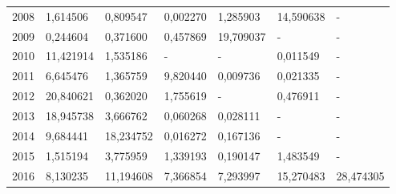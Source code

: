 \begin{table}
\begin{tabular}{p{1cm}p{2cm}p{2cm}p{2cm}p{2cm}p{2cm}p{2cm}}
 2008 &                               1,614506 &                                   0,809547 &               0,002270 &                                     1,285903 &                      14,590638 &                       - \\
 2009 &                               0,244604 &                                   0,371600 &               0,457869 &                                    19,709037 &                              - &                       - \\
 2010 &                              11,421914 &                                   1,535186 &                      - &                                            - &                       0,011549 &                       - \\
 2011 &                               6,645476 &                                   1,365759 &               9,820440 &                                     0,009736 &                       0,021335 &                       - \\
 2012 &                              20,840621 &                                   0,362020 &               1,755619 &                                            - &                       0,476911 &                       - \\
 2013 &                              18,945738 &                                   3,666762 &               0,060268 &                                     0,028111 &                              - &                       - \\
 2014 &                               9,684441 &                                  18,234752 &               0,016272 &                                     0,167136 &                              - &                       - \\
 2015 &                               1,515194 &                                   3,775959 &               1,339193 &                                     0,190147 &                       1,483549 &                       - \\
 2016 &                               8,130235 &                                  11,194608 &               7,366854 &                                     7,293997 &                      15,270483 &               28,474305 \\
\bottomrule
\end{tabular}
\end{table}
